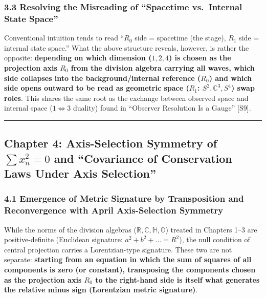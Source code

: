 \documentclass[
  a4paper,
]{article}
\begin{document}
\subsubsection{3.3 Resolving the Misreading of ``Spacetime vs.~Internal
State
Space''}\label{resolving-the-misreading-of-spacetime-vs.-internal-state-space}

Conventional intuition tends to read ``\(R_0\) side = spacetime (the
stage), \(R_1\) side = internal state space.'' What the above structure
reveals, however, is rather the opposite: \textbf{depending on which
dimension (\(1, 2, 4\)) is chosen as the projection axis \(R_0\) from
the division algebra carrying all waves, which side collapses into the
background/internal reference (\(R_0\)) and which side opens outward to
be read as geometric space (\(R_1\): \(S^2, \mathbb{C}^3, S^4\)) swap
roles}. This shares the same root as the exchange between observed space
and internal space (\(1 \Leftrightarrow 3\) duality) found in ``Observer
Resolution Is a Gauge'' {[}S9{]}.

\begin{center}\rule{0.5\linewidth}{0.5pt}\end{center}

\subsection{\texorpdfstring{Chapter 4: Axis-Selection Symmetry of
\(\sum x_n^2 = 0\) and ``Covariance of Conservation Laws Under Axis
Selection''}{Chapter 4: Axis-Selection Symmetry of \textbackslash sum x\_n\^{}2 = 0 and ``Covariance of Conservation Laws Under Axis Selection''}}\label{chapter-4-axis-selection-symmetry-of-sum-x_n2-0-and-covariance-of-conservation-laws-under-axis-selection}

\subsubsection{4.1 Emergence of Metric Signature by Transposition and
Reconvergence with April Axis-Selection
Symmetry}\label{emergence-of-metric-signature-by-transposition-and-reconvergence-with-april-axis-selection-symmetry}

While the norms of the division algebras
(\(\mathbb{R}, \mathbb{C}, \mathbb{H}, \mathbb{O}\)) treated in Chapters
1--3 are positive-definite (Euclidean signature:
\(a^2 + b^2 + \dots = R^2\)), the null condition of central projection
carries a Lorentzian-type signature. These two are not separate:
\textbf{starting from an equation in which the sum of squares of all
components is zero (or constant), transposing the components chosen as
the projection axis \(R_0\) to the right-hand side is itself what
generates the relative minus sign (Lorentzian metric signature)}.
\end{document}
